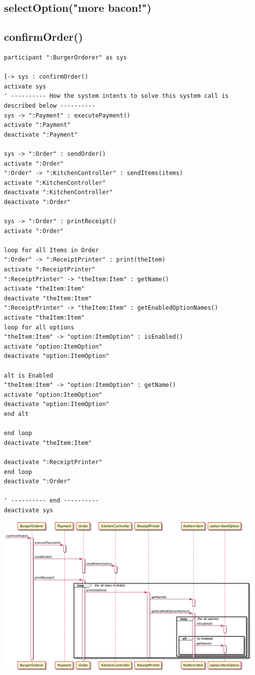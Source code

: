 \documentclass[11pt]{article}
\begin{document}
\subsection{selectOption("more bacon!")}
\label{sec:org607aff7}
\subsection{confirmOrder()}
\label{sec:org52dd479}
\begin{verbatim}
participant ":BurgerOrderer" as sys

[-> sys : confirmOrder()
activate sys
' ---------- How the system intents to solve this system call is described below ----------
sys -> ":Payment" : executePayment()
activate ":Payment"
deactivate ":Payment"

sys -> ":Order" : sendOrder()
activate ":Order"
":Order" -> ":KitchenController" : sendItems(items)
activate ":KitchenController"
deactivate ":KitchenController"
deactivate ":Order"

sys -> ":Order" : printReceipt()
activate ":Order"

loop for all Items in Order
":Order" -> ":ReceiptPrinter" : print(theItem)
activate ":ReceiptPrinter"
":ReceiptPrinter" -> "theItem:Item" : getName()
activate "theItem:Item"
deactivate "theItem:Item"
":ReceiptPrinter" -> "theItem:Item" : getEnabledOptionNames()
activate "theItem:Item"
loop for all options
"theItem:Item" -> "option:ItemOption" : isEnabled()
activate "option:ItemOption"
deactivate "option:ItemOption"

alt is Enabled
"theItem:Item" -> "option:ItemOption" : getName()
activate "option:ItemOption"
deactivate "option:ItemOption"
end alt

end loop
deactivate "theItem:Item"

deactivate ":ReceiptPrinter"
end loop
deactivate ":Order"

' ---------- end ----------
deactivate sys
\end{verbatim}

\begin{center}
\includegraphics[width=.9\linewidth]{202004-bo-confirmorder.png}
\end{center}
\end{document}
